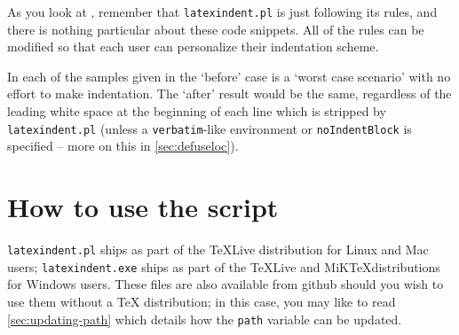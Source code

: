 \documentclass[10pt]{article}
\newenvironment{sidebyside}{\begin{adjustwidth}{-3cm}{0cm}}{\end{adjustwidth}}
\begin{document}
As you look at , remember
that \texttt{latexindent.pl} is just following its rules, and there is nothing
particular about these code snippets. All of the rules can be modified
so that each user can personalize their indentation scheme.

In each of the samples given in 
the `before' case is a `worst case scenario' with no effort to make indentation. The `after'
result would be the same, regardless of the leading white space at the beginning of
each line which is stripped by \texttt{latexindent.pl} (unless a \texttt{verbatim}-like
environment or \texttt{noIndentBlock} is specified -- more on this in \cref{sec:defuseloc}).

\begin{sidebyside}
	\centering
	\begin{minipage}{.45\linewidth}
	\end{minipage}\hfill
	\begin{minipage}{.45\linewidth}
	\end{minipage}%

	\begin{minipage}{.45\linewidth}
	\end{minipage}\hfill
	\begin{minipage}{.45\linewidth}
	\end{minipage}%

	\begin{minipage}{.45\linewidth}
	\end{minipage}\hfill
	\begin{minipage}{.45\linewidth}
	\end{minipage}%
\end{sidebyside}


\section{How to use the script}
\texttt{latexindent.pl} ships as part of the \TeX Live distribution for
Linux and Mac users; \texttt{latexindent.exe} ships as part of the \TeX Live
and MiK\TeX distributions for Windows users. These files are also available
from github \cite{latexindent-home} should you wish to use them without
a \TeX{} distribution; in this case, you may like to read \vref{sec:updating-path}
which details how the \texttt{path} variable can be updated.
\end{document}
